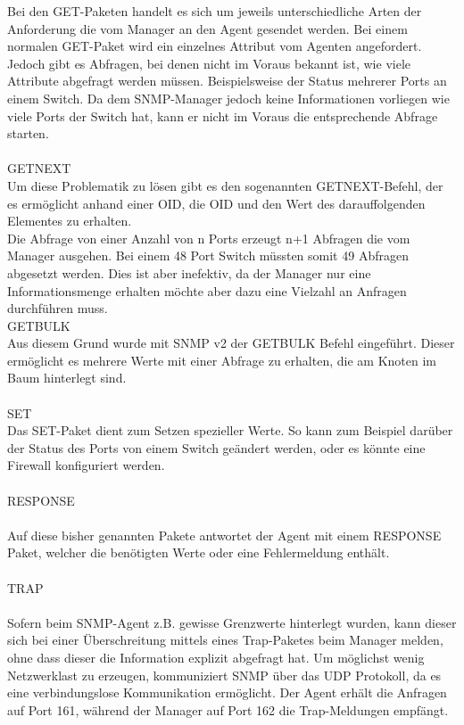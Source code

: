 Bei den GET-Paketen handelt es sich um jeweils unterschiedliche Arten der Anforderung die vom Manager an den Agent gesendet werden.
Bei einem normalen GET-Paket wird ein einzelnes Attribut vom Agenten angefordert. Jedoch gibt es Abfragen, bei denen nicht im Voraus bekannt ist, wie viele Attribute abgefragt werden müssen. Beispielsweise der Status mehrerer Ports an einem Switch. Da dem SNMP-Manager jedoch keine Informationen vorliegen wie viele Ports der Switch hat, kann er nicht im Voraus die entsprechende Abfrage starten.\\
\\
GETNEXT\\

Um diese Problematik zu lösen gibt es den sogenannten GETNEXT-Befehl, der es ermöglicht anhand einer OID, die OID und den Wert des darauffolgenden Elementes zu erhalten.\\

Die Abfrage von einer Anzahl von n Ports erzeugt n+1 Abfragen die vom Manager ausgehen.
Bei einem 48 Port Switch müssten somit 49 Abfragen abgesetzt werden.
Dies ist aber inefektiv, da der Manager nur eine Informationsmenge erhalten möchte aber dazu eine Vielzahl an Anfragen durchführen muss.
\\
GETBULK\\

Aus diesem Grund wurde mit SNMP v2 der GETBULK Befehl eingeführt. Dieser ermöglicht es mehrere Werte mit einer Abfrage zu erhalten, die am Knoten im Baum hinterlegt sind.\\
\\
SET\\

Das SET-Paket dient zum Setzen spezieller Werte.
So kann zum Beispiel darüber der Status des Ports von einem Switch  geändert werden, oder es könnte eine Firewall konfiguriert werden.
\\
\\
RESPONSE\\
\\
Auf diese bisher genannten Pakete antwortet der Agent mit einem RESPONSE Paket, welcher die benötigten Werte oder eine Fehlermeldung enthält.\\
\\
TRAP\\
\\
Sofern beim SNMP-Agent z.B. gewisse Grenzwerte hinterlegt wurden, kann dieser sich bei einer Überschreitung mittels eines Trap-Paketes beim Manager melden, ohne dass dieser die Information explizit abgefragt hat.
Um möglichst wenig Netzwerklast zu erzeugen, kommuniziert SNMP über das UDP Protokoll, da es eine verbindungslose Kommunikation ermöglicht.
Der Agent erhält die Anfragen auf Port 161, während der Manager auf Port 162 die Trap-Meldungen empfängt.\\





